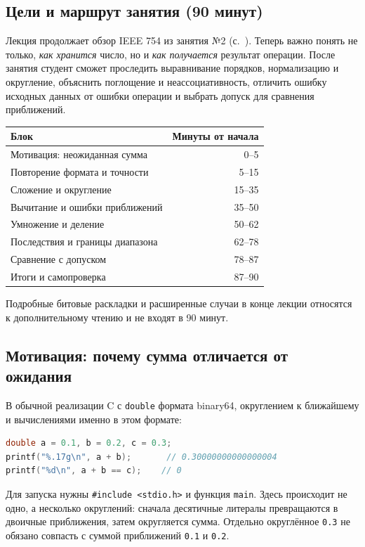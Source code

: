 \label{lecture03}
\subsection*{Цели и маршрут занятия (90 минут)}
Лекция продолжает обзор IEEE 754 из занятия №2
(с.~\pageref{lecture02-float}). Теперь важно понять не только, \emph{как
хранится} число, но и \emph{как получается} результат операции.
После занятия студент сможет проследить выравнивание порядков,
нормализацию и округление, объяснить поглощение и неассоциативность,
отличить ошибку исходных данных от ошибки операции и выбрать допуск
для сравнения приближений.

\begin{center}
\begin{tabular}{|l|r|}
\hline
Блок & Минуты от начала \\
\hline
Мотивация: неожиданная сумма & 0--5 \\
Повторение формата и точности & 5--15 \\
Сложение и округление & 15--35 \\
Вычитание и ошибки приближений & 35--50 \\
Умножение и деление & 50--62 \\
Последствия и границы диапазона & 62--78 \\
Сравнение с допуском & 78--87 \\
Итоги и самопроверка & 87--90 \\
\hline
\end{tabular}
\end{center}
Подробные битовые раскладки и расширенные случаи в конце лекции
относятся к дополнительному чтению и не входят в 90 минут.

\subsection{Мотивация: почему сумма отличается от ожидания}
В обычной реализации C с \texttt{double} формата binary64, округлением
к ближайшему и вычислениями именно в этом формате:
\begin{lstlisting}[language=C,basicstyle=\ttfamily\small]
double a = 0.1, b = 0.2, c = 0.3;
printf("%.17g\n", a + b);       // 0.30000000000000004
printf("%d\n", a + b == c);    // 0
\end{lstlisting}
Для запуска нужны \texttt{\#include <stdio.h>} и функция \texttt{main}.
Здесь происходит не одно, а несколько округлений: сначала десятичные
литералы превращаются в двоичные приближения, затем округляется сумма.
Отдельно округлённое \texttt{0.3} не обязано совпасть с суммой
приближений \texttt{0.1} и \texttt{0.2}.

